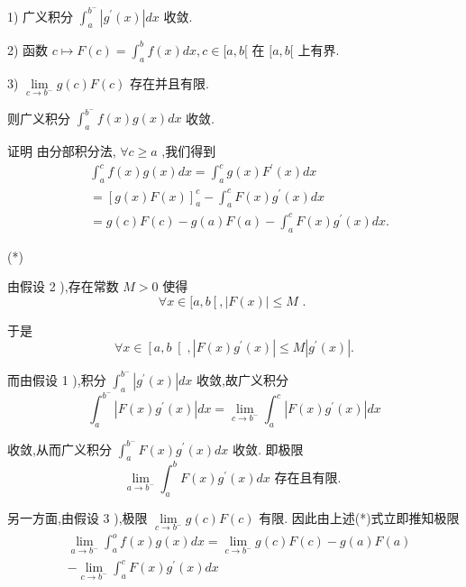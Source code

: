 1) 广义积分 ${\int }_{a}^{{b}^{ - }}\left| {{g}^{\prime }\left( x\right) }\right| {dx}$ 收敛.

2) 函数 $c \mapsto  F\left( c\right)  = {\int }_{a}^{b}f\left( x\right) {dx},c \in  \lbrack a,b\lbrack$ 在 $\lbrack a,b\lbrack$ 上有界.

3) $\mathop{\lim }\limits_{{c \rightarrow  {b}^{ - }}}g\left( c\right) F\left( c\right)$ 存在并且有限.

则广义积分 ${\int }_{a}^{{b}^{ - }}f\left( x\right) g\left( x\right) {dx}$ 收敛.

证明 由分部积分法, $\forall c \geq  a$ ,我们得到
\begin{align*}
	&{\int }_{a}^{c}f\left( x\right) g\left( x\right) {dx} = {\int }_{a}^{c}g\left( x\right) {F}^{\prime }\left( x\right) {dx}\\
	&= {\left\lbrack  g\left( x\right) F\left( x\right) \right\rbrack  }_{a}^{c} - {\int }_{a}^{c}F\left( x\right) {g}^{\prime }\left( x\right) {dx}\\
	&= g\left( c\right) F\left( c\right)  - g\left( a\right) F\left( a\right)  - {\int }_{a}^{c}F\left( x\right) {g}^{\prime }\left( x\right) {dx}.
\end{align*}

(*)

由假设 2 ),存在常数 $M > 0$ 使得
$$\forall x \in  \lbrack a,b\left\lbrack  {,\left| {F\left( x\right) }\right|  \leq  M}\right. \text{ . }$$

于是
$$\forall x \in  \left\lbrack  {a,b}\right\lbrack  ,\left| {F\left( x\right) {g}^{\prime }\left( x\right) }\right|  \leq  M\left| {{g}^{\prime }\left( x\right) }\right| .$$

而由假设 1 ),积分 ${\int }_{a}^{{b}^{ - }}\left| {{g}^{\prime }\left( x\right) }\right| {dx}$ 收敛,故广义积分
$${\int }_{a}^{{b}^{ - }}\left| {F\left( x\right) {g}^{\prime }\left( x\right) }\right| {dx} = \mathop{\lim }\limits_{{c \rightarrow  {b}^{ - }}}{\int }_{a}^{c}\left| {F\left( x\right) {g}^{\prime }\left( x\right) }\right| {dx}$$

收敛,从而广义积分 ${\int }_{a}^{{b}^{ - }}F\left( x\right) {g}^{\prime }\left( x\right) {dx}$ 收敛. 即极限
$$\mathop{\lim }\limits_{{a \rightarrow  {b}^{ - }}}{\int }_{a}^{b}F\left( x\right) {g}^{\prime }\left( x\right) {dx}\text{ 存在且有限. }$$

另一方面,由假设 3 ),极限 $\mathop{\lim }\limits_{{c \rightarrow  {b}^{ - }}}g\left( c\right) F\left( c\right)$ 有限. 因此由上述(*)式立即推知极限
\begin{align*}
	&\mathop{\lim }\limits_{{a \rightarrow  {b}^{ - }}}{\int }_{a}^{o}f\left( x\right) g\left( x\right) {dx} = \mathop{\lim }\limits_{{c \rightarrow  {b}^{ - }}}g\left( c\right) F\left( c\right)  - g\left( a\right) F\left( a\right)\\
	&- \mathop{\lim }\limits_{{c \rightarrow  {b}^{ - }}}{\int }_{a}^{c}F\left( x\right) {g}^{\prime }\left( x\right) {dx}
\end{align*}

